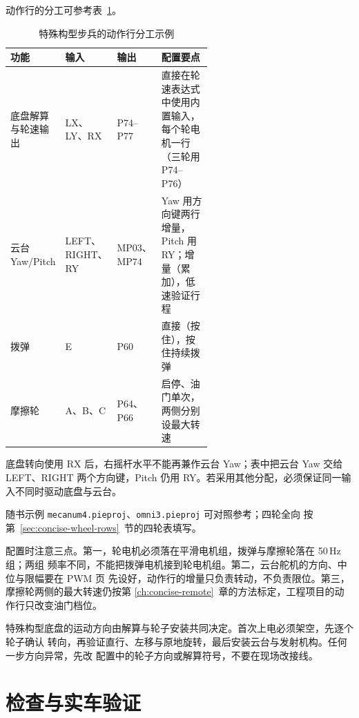 动作行的分工可参考表~\ref{tab:concise-special-infantry}。

\begin{table}[H]
  \centering
  \small
  \begin{tabularx}{\linewidth}{@{}>{\raggedright\arraybackslash}p{0.20\linewidth}
      >{\raggedright\arraybackslash}p{0.18\linewidth}
      >{\raggedright\arraybackslash}p{0.20\linewidth}
      >{\raggedright\arraybackslash}X@{}}
    \toprule
    功能 & 输入 & 输出 & 配置要点 \\
    \midrule
    底盘解算与轮速输出 & LX、LY、RX & P74--P77 & 直接在轮速表达式中使用内置输入，每个轮电机一行（三轮用 P74--P76） \\
    云台 Yaw/Pitch & LEFT、RIGHT、RY & MP03、MP74 & Yaw 用方向键两行增量，Pitch 用 RY；增量（累加），低速验证行程 \\
    拨弹 & E & P60 & 直接（按住），按住持续拨弹 \\
    摩擦轮 & A、B、C & P64、P66 & 启停、油门单次，两侧分别设最大转速 \\
    \bottomrule
  \end{tabularx}
  \caption{特殊构型步兵的动作行分工示例}
  \label{tab:concise-special-infantry}
\end{table}

底盘转向使用 RX 后，右摇杆水平不能再兼作云台 Yaw；表中把云台 Yaw 交给 LEFT、RIGHT
两个方向键，Pitch 仍用 RY。若采用其他分配，必须保证同一输入不同时驱动底盘与云台。

随书示例 \texttt{mecanum4.pieproj}、\texttt{omni3.pieproj} 可对照参考；四轮全向
按第~\ref{sec:concise-wheel-rows}~节的四轮表填写。

配置时注意三点。第一，轮电机必须落在平滑电机组，拨弹与摩擦轮落在 50\,Hz 组；两组
频率不同，不能把拨弹电机接到轮电机组。第二，云台舵机的方向、中位与限幅要在 PWM 页
先设好，动作行的增量只负责转动，不负责限位。第三，摩擦轮两侧的最大转速仍按第
\ref{ch:concise-remote}~章的方法标定，工程项目的动作行只改变油门档位。

\begin{note}
特殊构型底盘的运动方向由解算与轮子安装共同决定。首次上电必须架空，先逐个轮子确认
转向，再验证直行、左移与原地旋转，最后安装云台与发射机构。任何一步方向异常，先改
配置中的轮子方向或解算符号，不要在现场改接线。
\end{note}

\section{检查与实车验证}

